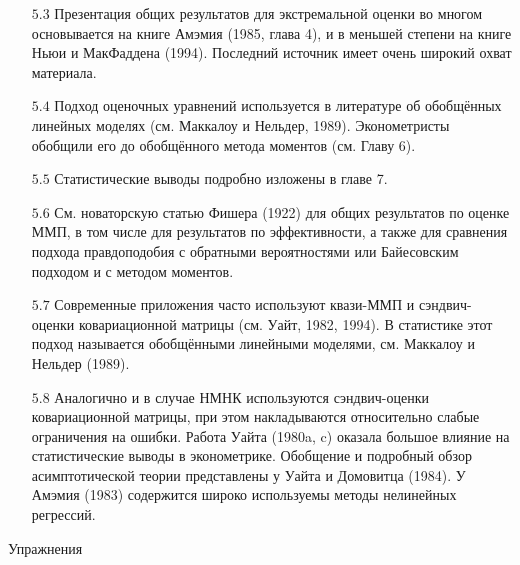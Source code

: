 \begin{enumerate}
\item [$5.3$] Презентация общих результатов для экстремальной оценки во многом основывается на книге Амэмия (1985, глава 4), и в меньшей степени на книге Ньюи и МакФаддена (1994). Последний источник имеет очень широкий охват материала.
\item [$5.4$] Подход оценочных уравнений используется в литературе об обобщённых линейных моделях (см. Маккалоу и Нельдер, 1989). Эконометристы обобщили его до обобщённого метода моментов (см. Главу 6).
\item [$5.5$] Статистические выводы подробно изложены в главе 7.
\item [$5.6$] См. новаторскую статью Фишера (1922) для общих результатов по оценке ММП, в том числе для результатов по эффективности, а также для сравнения подхода правдоподобия с обратными вероятностями или Байесовским подходом и с методом моментов.
\item [$5.7$] Современные приложения часто используют квази-ММП и сэндвич-оценки ковариационной матрицы (см. Уайт, 1982, 1994). В статистике этот подход называется обобщёнными линейными моделями,  см. Маккалоу и Нельдер (1989).
\item [$5.8$] Аналогично и в случае НМНК используются сэндвич-оценки ковариационной матрицы, при этом накладываются относительно слабые ограничения на ошибки. Работа Уайта (1980a, c) оказала большое влияние на статистические выводы в эконометрике. Обобщение и подробный обзор асимптотической теории представлены у Уайта и Домовитца (1984). У Амэмия (1983) содержится широко используемы методы нелинейных регрессий.
\end{enumerate}

\begin{center}
Упражнения
\end{center}


